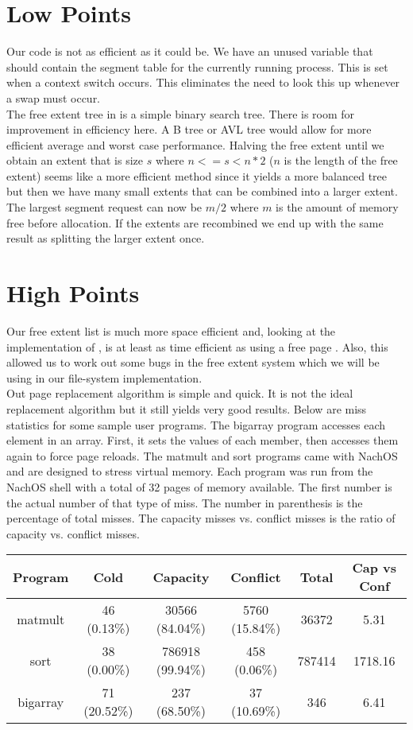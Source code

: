     \section{Low Points}
	Our code is not as efficient as it could be. We have an unused variable
	 that should contain the segment table for the
	currently running process. This  is set when a context switch
	occurs. This eliminates the need to look this up whenever a swap must
	occur.\\

	The free extent tree in  is a simple binary search tree.
	There is room for improvement in efficiency here. A B tree or AVL tree would
	allow for more efficient average and worst case performance.
	Halving the free extent until we obtain an extent that is
	size $s$ where $n <= s < n*2$ ($n$ is the length of the free extent)
	seems like a more efficient method since it yields a more balanced tree
	but then we have many small extents that can be combined into a larger
	extent. The largest segment request can now be $m/2$ where $m$ is the
	amount of memory free before allocation. If the extents are recombined we
	end up with the same result as splitting the larger extent once.\\

    \section{High Points}
	Our free extent list is much more space efficient and, looking at the
	implementation of , is at least as time efficient as using a
	free page . Also, this allowed us to work out some bugs in
	the free extent system which we will be using in our file-system
	implementation.\\

	Out page replacement algorithm is simple and quick. It is not the ideal
	replacement algorithm but it still yields very good results. Below are miss
	statistics for some sample user programs. The bigarray program accesses
	each element in an  array. First, it sets the values of
	each member, then accesses them again to force page reloads. The matmult
	and sort programs came with NachOS and are designed to stress virtual
	memory. Each program was run from the NachOS shell with a total of 32 pages of
	memory available. The first number is the actual number of that type of miss.
	The number in parenthesis is the percentage of total misses. The capacity
	misses vs. conflict misses is the ratio of capacity vs. conflict misses.\\

	\begin{tabular}{|c||c|c|c|c|c|}
	\hline
Program  & Cold         & Capacity         & Conflict       & Total & Cap vs Conf\\
\hline
matmult  & 46 (0.13\%)  & 30566  (84.04\%) & 5760 (15.84\%) & 36372  & 5.31    \\
sort     & 38 (0.00\%)  & 786918 (99.94\%) & 458  (0.06\%)  & 787414 & 1718.16 \\
bigarray & 71 (20.52\%) & 237    (68.50\%) & 37   (10.69\%) & 346    & 6.41    \\
\hline
	\end{tabular}
